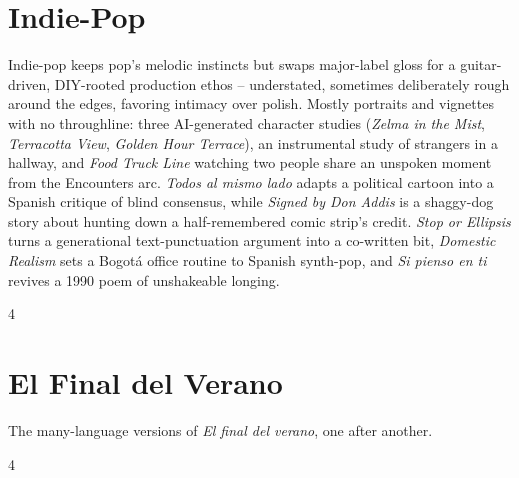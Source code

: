 \documentclass[a4paper,landscape]{memoir}
\begin{document}
\chapter{Indie-Pop}
Indie-pop keeps pop's melodic instincts but swaps major-label gloss for a guitar-driven, DIY-rooted production ethos -- understated, sometimes deliberately rough around the edges, favoring intimacy over polish. Mostly portraits and vignettes with no throughline: three AI-generated character studies (\emph{Zelma in the Mist}, \emph{Terracotta View}, \emph{Golden Hour Terrace}), an instrumental study of strangers in a hallway, and \emph{Food Truck Line} watching two people share an unspoken moment from the Encounters arc. \emph{Todos al mismo lado} adapts a political cartoon into a Spanish critique of blind consensus, while \emph{Signed by Don Addis} is a shaggy-dog story about hunting down a half-remembered comic strip's credit. \emph{Stop or Ellipsis} turns a generational text-punctuation argument into a co-written bit, \emph{Domestic Realism} sets a Bogotá office routine to Spanish synth-pop, and \emph{Si pienso en ti} revives a 1990 poem of unshakeable longing.
\clearpage\begin{multicols*}{4}
\end{multicols*}

\chapter{El Final del Verano}
The many-language versions of \emph{El final del verano}, one after another.
\clearpage\begin{multicols*}{4}
\end{multicols*}
\end{document}
